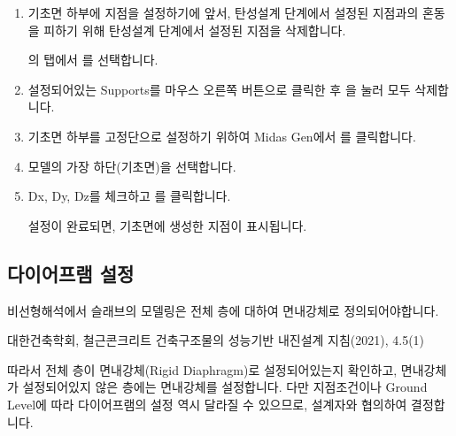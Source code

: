 \documentclass[a4paper,11pt,korean,openany,oneside]{sphinxmanual}
\begin{document}
\begin{sphinxShadowBox}
\begin{enumerate}
%
\item {} 
\sphinxAtStartPar
기초면 하부에 지점을 설정하기에 앞서, 탄성설계 단계에서 설정된 지점과의 혼동을 피하기 위해 탄성설계 단계에서 설정된 지점을 삭제합니다.

\sphinxAtStartPar
{}의  탭에서  \sphinxhyphen{} 를 선택합니다.

\item {} 
\sphinxAtStartPar
설정되어있는 Supports를 마우스 오른쪽 버튼으로 클릭한 후 을 눌러 모두 삭제합니다.

\item {} 
\sphinxAtStartPar
기초면 하부를 고정단으로 설정하기 위하여 Midas Gen에서  \sphinxhyphen{} 를 클릭합니다.

\item {} 
\sphinxAtStartPar
모델의 가장 하단(기초면)을 선택합니다.

\begin{center}
\noindent{}
\end{center}

\item {} 
\sphinxAtStartPar
Dx, Dy, Dz를 체크하고 를 클릭합니다.

\sphinxAtStartPar
설정이 완료되면, 기초면에 생성한 지점이 표시됩니다.

\begin{center}
\noindent{}
\end{center}

\end{enumerate}
\end{sphinxShadowBox}


\subsection{다이어프램 설정}
\label{\detokenize{1_support_setting:id4}}
\sphinxAtStartPar
비선형해석에서 슬래브의 모델링은 전체 층에 대하여 면내강체로 정의되어야합니다. %
\begin{footnote}[2]\sphinxAtStartFootnote
대한건축학회, 철근콘크리트 건축구조물의 성능기반 내진설계 지침(2021), 4.5\sphinxhyphen{}(1)
%
\end{footnote}
따라서 전체 층이 면내강체(Rigid Diaphragm)로 설정되어있는지 확인하고, 면내강체가 설정되어있지 않은 층에는 면내강체를 설정합니다.
다만 지점조건이나 Ground Level에 따라 다이어프램의 설정 역시 달라질 수 있으므로, 설계자와 협의하여 결정합니다.
\end{document}
